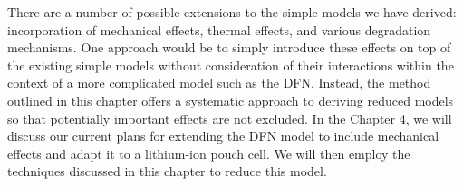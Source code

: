 \documentclass[preprint]{elsarticle}
\begin{document}
There are a number of possible extensions to the simple models we have derived: incorporation of mechanical effects, thermal effects, and various degradation mechanisms. One approach would be to simply introduce these effects on top of the existing simple models without consideration of their interactions within the context of a more complicated model such as the DFN. Instead, the method outlined in this chapter offers a systematic approach to deriving reduced models so that potentially important effects are not excluded. In the Chapter 4, we will discuss our current plans for extending the DFN model to include mechanical effects and adapt it to a lithium-ion pouch cell. We will then employ the techniques discussed in this chapter to reduce this model.  




\appendix


\end{document}
